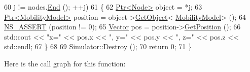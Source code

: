 \begin{DoxyCode}
60        j != nodes.\hyperlink{classns3_1_1NodeContainer_a8ea0bcac137597d192c5e6b95ca60464}{End} (); ++j)
61     \{
62       \hyperlink{classns3_1_1Ptr}{Ptr<Node>} \textcolor{keywordtype}{object} = *j;
63       \hyperlink{classns3_1_1Ptr}{Ptr<MobilityModel>} position = \textcolor{keywordtype}{object}->\hyperlink{classns3_1_1Object_a13e18c00017096c8381eb651d5bd0783}{GetObject}<
      \hyperlink{classns3_1_1MobilityModel}{MobilityModel}> ();
64       \hyperlink{assert_8h_a6dccdb0de9b252f60088ce281c49d052}{NS\_ASSERT} (position != 0);
65       \hyperlink{classns3_1_1Vector3D_a7e59b47bc94c9cb1dadff68c1d0112d8}{Vector} pos = position->\hyperlink{classns3_1_1MobilityModel_aba838f06ec5bbb2d193d94b8c0e4abb4}{GetPosition} ();
66       std::cout << \textcolor{stringliteral}{"x="} << pos.x << \textcolor{stringliteral}{", y="} << pos.y << \textcolor{stringliteral}{", z="} << pos.z << std::endl;
67     \}
68 
69   Simulator::Destroy ();
70   \textcolor{keywordflow}{return} 0;
71 \}
\end{DoxyCode}


Here is the call graph for this function\+:


